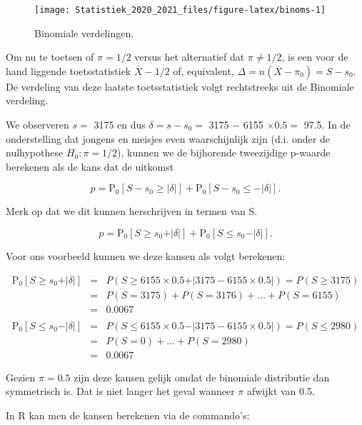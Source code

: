 \documentclass[
  12pt,dutch,coursenotes]{book}
\theoremstyle{definition}
\theoremstyle{definition}
\theoremstyle{definition}
\theoremstyle{remark}
\begin{document}
\begin{figure}

{\centering \texttt{[image: Statistiek\_2020\_2021\_files/figure-latex/binoms-1]} 

}

\caption{Binomiale verdelingen.}\label{fig:binoms}
\end{figure}

Om nu te toetsen of \(\pi=1/2\) versus het alternatief dat \(\pi\neq 1/2\), is een
voor de hand liggende toetsstatistiek \(\bar X-1/2\) of, equivalent, \(\Delta=n(\bar X-\pi_0)=S-s_0\). De verdeling van deze laatste toetsstatistiek volgt
rechtstreeks uit de Binomiale verdeling.

We observeren \(s=\) 3175 en dus \(\delta=s-s_0=\) 3175 \(-\) 6155 \(\times 0.5=\) 97.5.
In de onderstelling dat jongens en meisjes even waarschijnlijk zijn (d.i. onder de nulhypothese \(H_0:\pi=1/2\)), kunnen we de bijhorende tweezijdige p-waarde berekenen als de kans dat de uitkomst

\[p=\text{P}_0\left[S-s_0\geq \vert \delta\vert \right] + \text{P}_0\left[S-s_0\leq - \vert \delta\vert \right].\]

Merk op dat we dit kunnen herschrijven in termen van S.

\[p=\text{P}_0\left[S\geq s_0+ \vert \delta\vert \right] + \text{P}_0\left[S \leq s_0 - \vert \delta\vert \right].\]

Voor ons voorbeeld kunnen we deze kansen als volgt berekenen:

\begin{eqnarray*}
\text{P}_0\left[S\geq s_0+ \vert \delta\vert \right] &=& P(S \geq 6155 \times 0.5 + \vert 3175 - 6155 \times 0.5\vert ) = P(S \geq 3175)\\
&= &P(S= 3175) + P(S=3176) + ... + P(S=6155)\\
& =& 0.0067\\\\
\text{P}_0\left[S \leq s_0 - \vert \delta\vert \right] &=& P(S \leq  6155 \times 0.5 - \vert 3175- 6155 \times 0.5\vert) = P(S \leq 2980)\\ &= &P(S=0) + ... + P(S=2980) \\
&=&0.0067
\end{eqnarray*}

Gezien \(\pi=0.5\) zijn deze kansen gelijk omdat de binomiale distributie dan symmetrisch is. Dat is niet langer het geval wanneer \(\pi\) afwijkt van 0.5.

In R kan men de kansen berekenen via de commando's:
\end{document}
